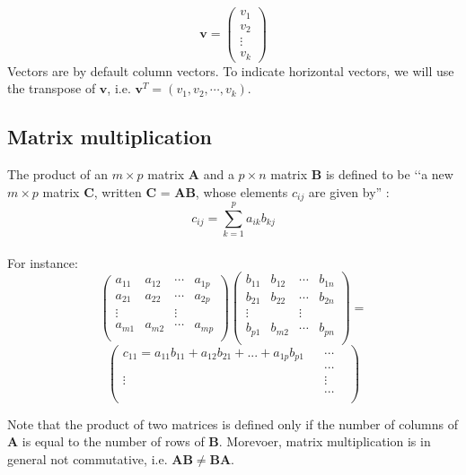 \documentclass[\main/main.tex]{subfiles}
\begin{document}
\begin{equation}
\mathbf{v} =
\begin{pmatrix}
v_1\\
v_2\\
\vdots\\
 v_k
\end{pmatrix}
\end{equation}
Vectors are by default column vectors. To indicate horizontal vectors, we will use the transpose of $\mathbf{v}$, i.e.  $\mathbf{v}^T = ( v_1,v_2, \cdots, v_k)$.

\subsection{Matrix multiplication}


The product of an $m \times p$ matrix $\mathbf{A}$ and a $p\times n$ matrix $\mathbf{B}$ is defined to be \lq\lq a new $m \times p$  matrix $\mathbf{C}$, written $\mathbf{C}$ = $\mathbf{AB}$, whose elements $c_{ij}$ are given by'' \citep{Bradley1977AppliedProgramming}:
\begin{equation}
    c_{ij} = \sum_{k=1}^p a_{ik}b_{kj}
\end{equation}\\

\noindent For instance:
\begin{equation*}
\begin{pmatrix}
a_{11} & a_{12} & \cdots & a_{1p}\\
a_{21} & a_{22} & \cdots & a_{2p}\\
\vdots & & \vdots\\
a_{m1} & a_{m2} & \cdots & a_{mp}\\
\end{pmatrix}
\begin{pmatrix}
b_{11} & b_{12} & \cdots & b_{1n}\\
b_{21} & b_{22} & \cdots & b_{2n}\\
\vdots & & \vdots\\
b_{p1} & b_{m2} & \cdots & b_{pn}\\
\end{pmatrix}
= 
\end{equation*}
\begin{equation*}
\begin{pmatrix}
c_{11} = a_{11}b_{11} + a_{12}b_{21} + ...+ a_{1p}b_{p1} &  & \cdots & \\
 &  & \cdots & \\
\vdots & & \vdots\\
 &  & \cdots & \\
\end{pmatrix}
\end{equation*}

\noindent Note that the product of two matrices is defined only if the number of columns of $\mathbf{A}$ is equal to the number of rows of $\mathbf{B}$. Morevoer, matrix multiplication is in general not commutative, i.e. $\mathbf{AB} \neq \mathbf{BA}$.
\end{document}
